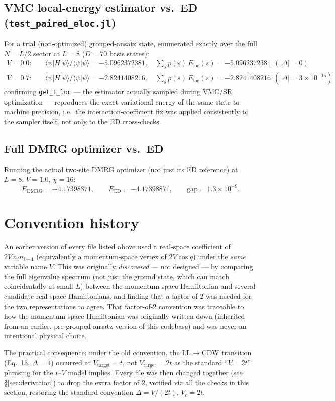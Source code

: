 \documentclass[11pt]{article}
\begin{document}
\subsection{VMC local-energy estimator vs.\ ED (\texttt{test\_paired\_eloc.jl})}

For a trial (non-optimized) grouped-ansatz state, enumerated exactly over
the full $N=L/2$ sector at $L=8$ ($D=70$ basis states):
\begin{align*}
V=0.0:&\quad \langle\psi|H|\psi\rangle/\langle\psi|\psi\rangle = -5.0962372381,
   \quad \textstyle\sum_s p(s)\,E_{\text{loc}}(s) = -5.0962372381
   \ \ (|\Delta|=0)\\
V=0.7:&\quad \langle\psi|H|\psi\rangle/\langle\psi|\psi\rangle = -2.8241408216,
   \quad \textstyle\sum_s p(s)\,E_{\text{loc}}(s) = -2.8241408216
   \ \ (|\Delta|=3\times10^{-15})
\end{align*}
confirming \texttt{get\_E\_loc} — the estimator actually sampled during
VMC/SR optimization — reproduces the exact variational energy of the same
state to machine precision, i.e.\ the interaction-coefficient fix was
applied consistently to the sampler itself, not only to the ED
cross-checks.

\subsection{Full DMRG optimizer vs.\ ED}

Running the actual two-site DMRG optimizer (not just its ED reference) at
$L=8$, $V=1.0$, $\chi=16$:
\[
E_{\text{DMRG}} = -4.17398871, \qquad E_{\text{ED}} = -4.17398871,
\qquad \text{gap} = 1.3\times10^{-9}.
\]

\section{Convention history}
\label{sec:history}

An earlier version of every file listed above used a real-space
coefficient of $2V\,n_in_{i+1}$ (equivalently a momentum-space vertex of
$2V\cos q$) under the \emph{same} variable name $V$. This was originally
\emph{discovered} — not designed — by comparing the full eigenvalue
spectrum (not just the ground state, which can match coincidentally at
small $L$) between the momentum-space Hamiltonian and several candidate
real-space Hamiltonians, and finding that a factor of $2$ was needed for the
two representations to agree. That factor-of-2 convention was traceable to
how the momentum-space Hamiltonian was originally written down (inherited
from an earlier, pre-grouped-ansatz version of this codebase) and was never
an intentional physical choice.

The practical consequence: under the old convention, the LL$\to$CDW
transition (Eq.~13, $\Delta=1$) occurred at $V_{\text{target}}=t$, not
$V_{\text{target}}=2t$ as the standard ``$V=2t$'' phrasing for the $t$--$V$
model implies. Every file was then changed together (see
\S\ref{sec:derivation}) to drop the extra factor of $2$, verified via all
the checks in this section, restoring the standard convention
$\Delta=V/(2t)$, $V_c=2t$.
\end{document}
